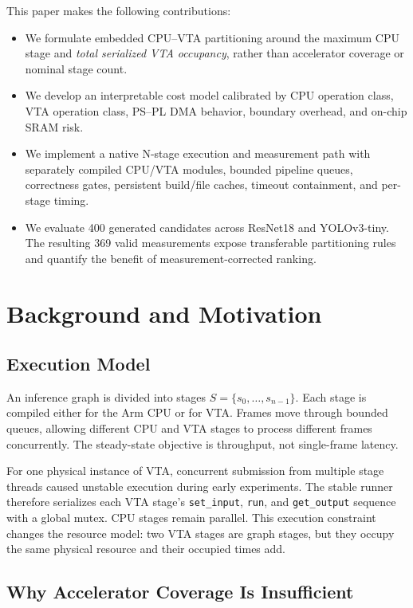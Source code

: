 \documentclass[conference]{IEEEtran}
\begin{document}
This paper makes the following contributions:

\begin{itemize}
  \item We formulate embedded CPU--VTA partitioning around the maximum CPU stage and \emph{total serialized VTA occupancy}, rather than accelerator coverage or nominal stage count.
  \item We develop an interpretable cost model calibrated by CPU operation class, VTA operation class, PS--PL DMA behavior, boundary overhead, and on-chip SRAM risk.
  \item We implement a native N-stage execution and measurement path with separately compiled CPU/VTA modules, bounded pipeline queues, correctness gates, persistent build/file caches, timeout containment, and per-stage timing.
  \item We evaluate 400 generated candidates across ResNet18 and YOLOv3-tiny. The resulting 369 valid measurements expose transferable partitioning rules and quantify the benefit of measurement-corrected ranking.
\end{itemize}

\section{Background and Motivation}

\subsection{Execution Model}

An inference graph is divided into stages $S=\{s_0,\ldots,s_{n-1}\}$. Each stage is compiled either for the Arm CPU or for VTA. Frames move through bounded queues, allowing different CPU and VTA stages to process different frames concurrently. The steady-state objective is throughput, not single-frame latency.

For one physical instance of VTA, concurrent submission from multiple stage threads caused unstable execution during early experiments. The stable runner therefore serializes each VTA stage's \texttt{set\_input}, \texttt{run}, and \texttt{get\_output} sequence with a global mutex. CPU stages remain parallel. This execution constraint changes the resource model: two VTA stages are graph stages, but they occupy the same physical resource and their occupied times add.

\subsection{Why Accelerator Coverage Is Insufficient}
\end{document}
